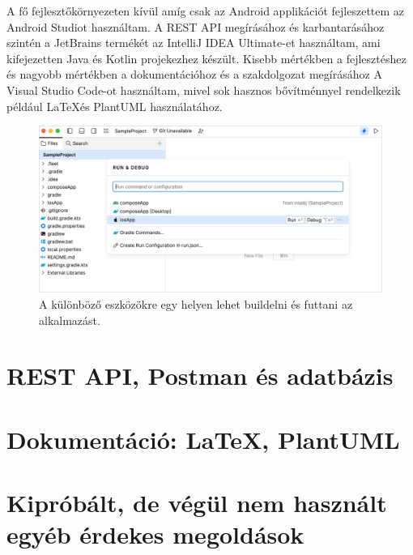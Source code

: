 A fő fejlesztőkörnyezeten kívül amíg csak az Android applikációt fejleszettem az Android Studiot használtam.
A REST API megírásához és karbantarásához szintén a JetBrains termékét az IntelliJ IDEA Ultimate-et használtam, ami kifejezetten Java és Kotlin projekezhez készült.
Kisebb mértékben a fejlesztéshez és nagyobb mértékben a dokumentációhoz és a szakdolgozat megírásához A Visual Studio Code-ot használtam, mivel sok hasznos bővítménnyel rendelkezik például \LaTeX és PlantUML használatához.


\begin{figure}[!ht]
    \centering
    \includegraphics[width=150mm, keepaspectratio]{figures/fleet-run-configurations.png}
    \caption{A különböző eszközökre egy helyen lehet buildelni és futtani az alkalmazást. \cite{Fleet}}
    \label{fig:RunConfigs}
\end{figure}




\section{REST API, Postman és adatbázis}

\section{Dokumentáció: \LaTeX, PlantUML}


\section{Kipróbált, de végül nem használt egyéb érdekes megoldások}